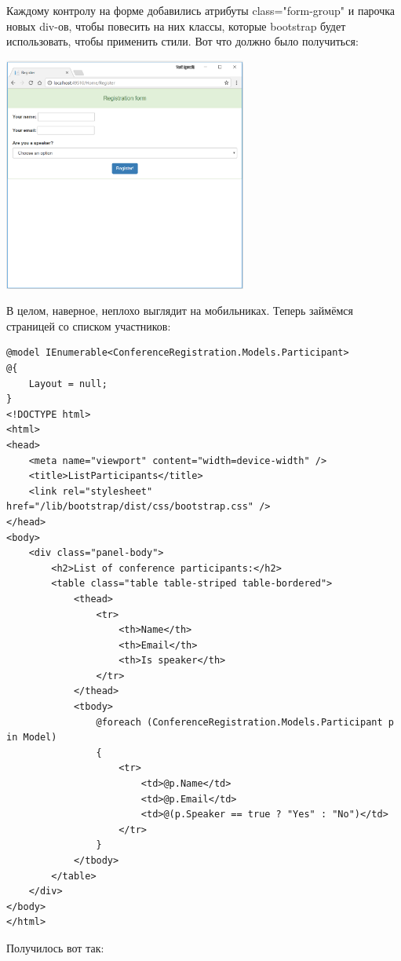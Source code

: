 \documentclass[a5paper]{article}
\begin{document}
Каждому контролу на форме добавились атрибуты class="form-group" и парочка новых div-ов, чтобы повесить на них классы, которые bootstrap будет использовать, чтобы применить стили. Вот что должно было получиться:

\begin{center}
    \includegraphics[width=0.6\textwidth]{styledRegisterForm.png}
\end{center}

В целом, наверное, неплохо выглядит на мобильниках. Теперь займёмся страницей со списком участников:

\begin{verbatim}
@model IEnumerable<ConferenceRegistration.Models.Participant>
@{
    Layout = null;
}
<!DOCTYPE html>
<html>
<head>
    <meta name="viewport" content="width=device-width" />
    <title>ListParticipants</title>
    <link rel="stylesheet" href="/lib/bootstrap/dist/css/bootstrap.css" />
</head>
<body>
    <div class="panel-body">
        <h2>List of conference participants:</h2>
        <table class="table table-striped table-bordered">
            <thead>
                <tr>
                    <th>Name</th>
                    <th>Email</th>
                    <th>Is speaker</th>
                </tr>
            </thead>
            <tbody>
                @foreach (ConferenceRegistration.Models.Participant p in Model)
                {
                    <tr>
                        <td>@p.Name</td>
                        <td>@p.Email</td>
                        <td>@(p.Speaker == true ? "Yes" : "No")</td>
                    </tr>
                }
            </tbody>
        </table>
    </div>
</body>
</html>
\end{verbatim}

Получилось вот так:
\end{document}
